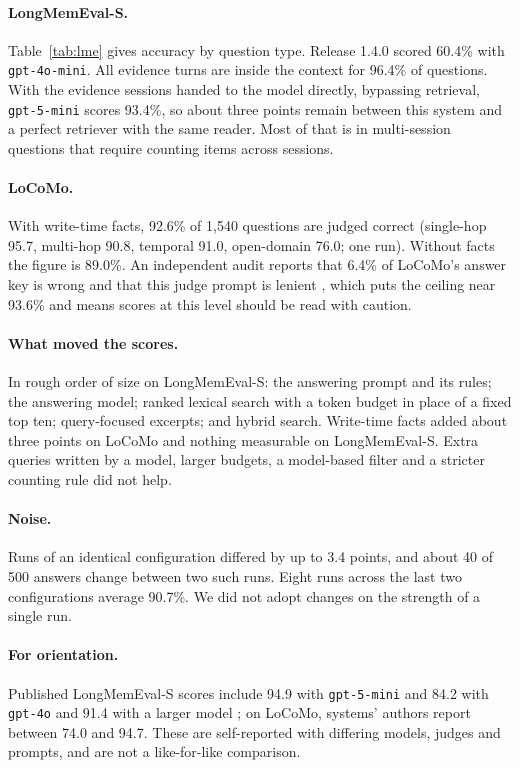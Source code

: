 \documentclass[11pt]{article}
\begin{document}
\paragraph{LongMemEval-S.} Table~\ref{tab:lme} gives accuracy by
question type. Release 1.4.0 scored 60.4\% with \texttt{gpt-4o-mini}.
All evidence turns are inside the context for 96.4\% of questions.
With the evidence sessions handed to the model directly, bypassing
retrieval, \texttt{gpt-5-mini} scores 93.4\%, so about three points
remain between this system and a perfect retriever with the same
reader. Most of that is in multi-session questions that require
counting items across sessions.

\paragraph{LoCoMo.} With write-time facts, 92.6\% of 1{,}540 questions
are judged correct (single-hop 95.7, multi-hop 90.8, temporal 91.0,
open-domain 76.0; one run). Without facts the figure is 89.0\%. An
independent audit reports that 6.4\% of LoCoMo's answer key is wrong
and that this judge prompt is lenient \citep{penfield2026locomo}, which
puts the ceiling near 93.6\% and means scores at this level should be
read with caution.

\paragraph{What moved the scores.} In rough order of size on
LongMemEval-S: the answering prompt and its rules; the answering
model; ranked lexical search with a token budget in place of a fixed
top ten; query-focused excerpts; and hybrid search. Write-time facts
added about three points on LoCoMo and nothing measurable on
LongMemEval-S. Extra queries written by a model, larger budgets, a
model-based filter and a stricter counting rule did not help.

\paragraph{Noise.} Runs of an identical configuration differed by up
to 3.4 points, and about 40 of 500 answers change between two such
runs. Eight runs across the last two configurations average 90.7\%.
We did not adopt changes on the strength of a single run.

\paragraph{For orientation.} Published LongMemEval-S scores include
94.9 with \texttt{gpt-5-mini} and 84.2 with \texttt{gpt-4o}
\citep{mastra2026om} and 91.4 with a larger model
\citep{hindsight2025}; on LoCoMo, systems' authors report between 74.0
and 94.7. These are self-reported with differing models, judges and
prompts, and are not a like-for-like comparison.
\end{document}
